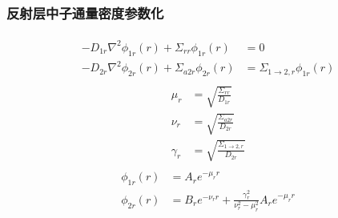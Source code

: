 \documentclass[handout,10pt]{beamer}
\begin{document}
\begin{frame}
\frametitle{反射层中子通量密度参数化}
\begin{align*}
    \begin{split}
        -D_{1r}\nabla^2\phi_{1r}(r) + \Sigma_{rr}\phi_{1r}(r) &= 0 \\
        -D_{2r}\nabla^2\phi_{2r}(r) + \Sigma_{a2r}\phi_{2r}(r) &= \Sigma_{1\rightarrow 2,r}\phi_{1r}(r)
    \end{split}
\end{align*}
\begin{align*}
    \begin{split}
        \mu_r &= \sqrt{\frac{\Sigma_{rr}}{D_{1r}}} \\
        \nu_r &= \sqrt{\frac{\Sigma_{a2r}}{D_{2r}}} \\
        \gamma_r &= \sqrt{\frac{\Sigma_{1\rightarrow 2,r}}{D_{2r}}}
    \end{split}
\end{align*}
\begin{align*}
    \begin{split}
        \phi_{1r}(r) &= A_r e^{-\mu_r r} \\
        \phi_{2r}(r) &= B_r e^{-\nu_r r} + \frac{\gamma_r^2}{\nu_r^2 - \mu_r^2}A_r e^{-\mu_r r}
    \end{split}
\end{align*}
\end{frame}
\end{document}
